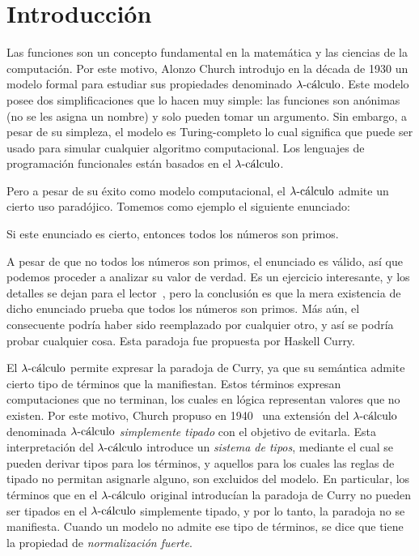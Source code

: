 \chapter{Introducción}\label{Chapter1}

Las funciones son un concepto fundamental en la matemática y las ciencias de la computación. Por este motivo, Alonzo Church introdujo en la década de 1930 un modelo formal para estudiar sus propiedades denominado \( \lambdacalculus \). Este modelo posee dos simplificaciones que lo hacen muy simple: las funciones son anónimas (no se les asigna un nombre) y solo pueden tomar un argumento. Sin embargo, a pesar de su simpleza, el modelo es Turing-completo lo cual significa que puede ser usado para simular cualquier algoritmo computacional. Los lenguajes de programación funcionales están basados en el \( \lambdacalculus \).

Pero a pesar de su éxito como modelo computacional, el \( \lambdacalculus \) admite un cierto uso paradójico. Tomemos como ejemplo el siguiente enunciado:
\begin{displayquote}
Si este enunciado es cierto, entonces todos los números son primos.
\end{displayquote}
A pesar de que no todos los números son primos, el enunciado es válido, así que podemos proceder a analizar su valor de verdad. Es un ejercicio interesante, y los detalles se dejan para el lector~\cite{sep-curry-paradox}, pero la conclusión es que la mera existencia de dicho enunciado prueba que todos los números son primos. Más aún, el consecuente podría haber sido reemplazado por cualquier otro, y así se podría probar cualquier cosa. Esta paradoja fue propuesta por Haskell Curry.

El \( \lambdacalculus \) permite expresar la paradoja de Curry, ya que su semántica admite cierto tipo de términos que la manifiestan. Estos términos expresan computaciones que no terminan, los cuales en lógica representan valores que no existen. Por este motivo, Church propuso en 1940~\cite{church1940formulation} una extensión del \( \lambdacalculus \) denominada \textit{\( \lambdacalculus \) simplemente tipado} con el objetivo de evitarla. Esta interpretación del \( \lambdacalculus \) introduce un \textit{sistema de tipos}, mediante el cual se pueden derivar tipos para los términos, y aquellos para los cuales las reglas de tipado no permitan asignarle alguno, son excluidos del modelo. En particular, los términos que en el \( \lambdacalculus \) original introducían la paradoja de Curry no pueden ser tipados en el \( \lambdacalculus \) simplemente tipado, y por lo tanto, la paradoja no se manifiesta. Cuando un modelo no admite ese tipo de términos, se dice que tiene la propiedad de \textit{normalización fuerte}.

